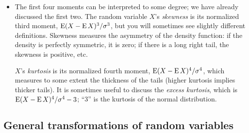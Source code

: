 \begin{itemize}[leftmargin=0pt]
\item The first four moments can be interpreted to some degree; we
  have already discussed the first two.  The random variable $X$'s
  \emph{skewness} is its normalized third moment, $\operatorname{E}(X - \operatorname{E} X)^3 /
  \sigma^3$, but you will sometimes see slightly different definitions.
  Skewness measures the asymmetry of the density function: if the
  density is perfectly symmetric, it is zero; if there is a long right
  tail, the skewness is positive, etc.

  $X$'s \emph{kurtosis} is its normalized fourth moment, $\operatorname{E}(X - \operatorname{E}
  X)^4 / \sigma^4$, which measures to some extent the thickness of the tails
  (higher kurtosis implies thicker tails).  It is sometimes useful to
  discuss the \emph{excess kurtosis}, which is $\operatorname{E}(X - \operatorname{E} X)^4 / \sigma^4 -
  3$; ``$3$'' is the kurtosis of the normal distribution.

\end{itemize}

\subsection{General transformations of random variables}

